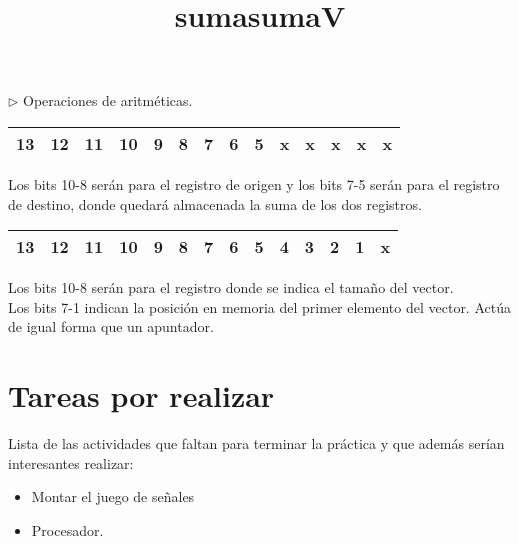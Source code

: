 \documentclass[%
	final,
	notitlepage,
	narroweqnarray,
	inline,
	twoside,
	]{ieee}
\begin{document}
\begin{itemize}



\subitem $\triangleright$ Operaciones de aritméticas.

\begin{table}[h]
\begin{center}
\title{suma}
\begin{tabular}{|c|c|c|c|c|c|c|c|c|c|c|c|c|c|}
\hline
13& 12& 11& 10& 9& 8& 7& 6& 5& x& x& x& x& x\\
\hline
\end{tabular}
\end{center}
\end{table}%
Los bits 10-8 serán para el registro de origen y los bits 7-5 serán para el registro
de destino, donde quedará almacenada la suma de los dos registros.\\


\begin{table}[htpd]
\begin{center}
\title{sumaV}
\begin{tabular}{|c|c|c|c|c|c|c|c|c|c|c|c|c|c|}
\hline
13& 12& 11& 10& 9& 8& 7& 6& 5& 4& 3& 2& 1& x\\
\hline
\end{tabular}
\end{center}
\end{table}%
Los bits 10-8 serán para el registro donde se indica el tamaño del vector.\\
Los bits 7-1 indican la posición en memoria del primer elemento del vector.
Actúa de igual forma que un apuntador.


\end{itemize}

\section{Tareas por realizar}
Lista de las actividades que faltan para terminar la práctica y
que además serían interesantes realizar:
\begin{itemize}
\item Montar el juego de señales
\item Procesador.
\end{itemize}
\end{document}
